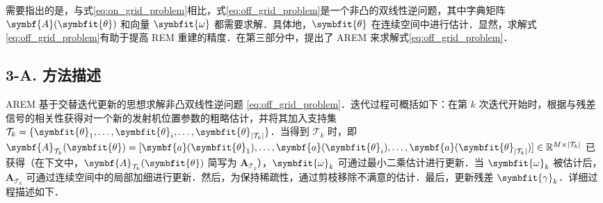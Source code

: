 \documentclass[a4paper,zihao=-4]{ctexart}
\renewcommand{\mathbf}[1]{\symbf{#1}}
\renewcommand{\boldsymbol}[1]{\symbfit{#1}}
\newcommand{\sidenote}[1]{\marginnote{\small\color{gray}#1}}
\begin{document}
需要指出的是，与式\eqref{eq:on_grid_problem}相比，式\eqref{eq:off_grid_problem}是一个非凸的双线性逆问题，其中字典矩阵 $\mathbf{A}(\boldsymbol{\theta})$ 和向量 $\boldsymbol{\omega}$ 都需要求解．具体地，$\boldsymbol{\theta}$ 在连续空间中进行估计．显然，求解式\eqref{eq:off_grid_problem}有助于提高 REM 重建的精度．在第三部分中，提出了 AREM 来求解式\eqref{eq:off_grid_problem}．

\subsection{3-A. 方法描述}

AREM 基于交替迭代更新的思想求解非凸双线性逆问题 \eqref{eq:off_grid_problem}．迭代过程可概括如下：在第 $k$ 次迭代开始时，根据与残差信号的相关性获得对一个新的发射机位置参数的粗略估计，并将其加入支持集 $\mathcal{T}_k = \{ \boldsymbol{\theta}_1, \ldots, \boldsymbol{\theta}_i, \ldots, \boldsymbol{\theta}_{|\mathcal{T}_k|} \}$．当得到 $\mathcal{T}_k$ 时，即 $\mathbf{A}_{\mathcal{T}_k}(\boldsymbol{\theta}) = [\mathbf{a}(\boldsymbol{\theta}_1), \dots, \mathbf{a}(\boldsymbol{\theta}_i), \dots, \mathbf{a}(\boldsymbol{\theta}_{|\mathcal{T}_k|})] \in \mathbb{R}^{M \times |\mathcal{T}_k|}$ 已获得（在下文中，$\mathbf{A}_{\mathcal{T}_k}(\boldsymbol{\theta})$ 简写为 $\mathbf{A}_{\mathcal{T}_k}$），$\boldsymbol{\omega}_k$ 可通过最小二乘估计进行更新．当 $\boldsymbol{\omega}_k$ 被估计后，$\mathbf{A}_{\mathcal{T}_k}$ 可通过连续空间中的局部加细进行更新．然后，为保持稀疏性，通过剪枝移除不满意的估计．最后，更新残差 $\boldsymbol{\gamma}_k$．详细过程描述如下．
\end{document}
